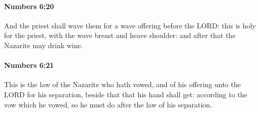 		\paragraph{Numbers 6:20} %
			\label{NUMBERS-6-20}

			And the priest shall wave them for a wave offering before the LORD: this is holy for the priest, with the wave breast and heave shoulder: and after that the Nazarite may drink wine.


		\paragraph{Numbers 6:21} %
			\label{NUMBERS-6-21}

			This is the law of the Nazarite who hath vowed, and of his offering unto the LORD for his separation, beside that that his hand shall get: according to the vow which he vowed, so he must do after the law of his separation.

